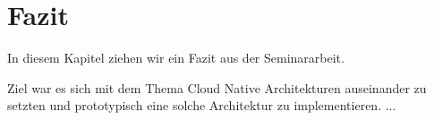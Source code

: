 \chapter{Fazit}

In diesem Kapitel ziehen wir ein Fazit aus der Seminararbeit.

Ziel war es sich mit dem Thema Cloud Native Architekturen auseinander zu setzten und prototypisch eine solche Architektur zu implementieren. ...